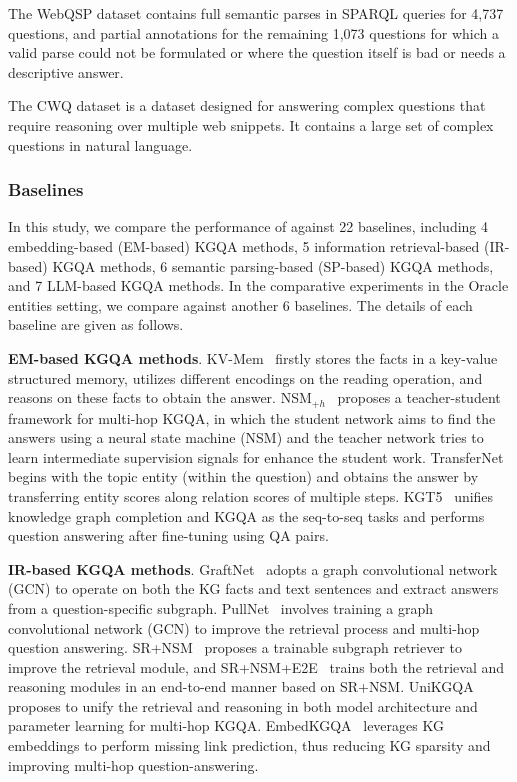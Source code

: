 The WebQSP dataset contains full semantic parses in SPARQL queries for 4,737 questions, and partial annotations for the remaining 1,073 questions for which a valid parse could not be formulated or where the question itself is bad or needs a descriptive answer.

The CWQ dataset is a dataset designed for answering complex questions that require reasoning over multiple web snippets. It contains a large set of complex questions in natural language.


\subsubsection{Baselines}

In this study, we compare the performance of \model against 22 baselines, including 4 embedding-based (EM-based) KGQA methods, 5 information retrieval-based (IR-based) KGQA methods, 6 semantic parsing-based (SP-based) KGQA methods, and 7 LLM-based KGQA methods.
In the comparative experiments in the Oracle entities setting, we compare \model against another 6 baselines.
The details of each baseline are given as follows.

\textbf{EM-based KGQA methods}.
KV-Mem~\cite{miller2016key} firstly stores the facts in a key-value structured memory, utilizes different encodings on the reading operation, and reasons on these facts to obtain the answer.
NSM$_{+h}$~\cite{NSM} proposes a teacher-student framework for multi-hop KGQA, in which the student network aims to find the answers using a neural state machine (NSM) and the teacher network tries to learn intermediate supervision signals for enhance the student work.
TransferNet~\cite{shi2021transfernet} begins with the topic entity (within the question) and obtains the answer by transferring entity scores along relation scores of multiple steps.
KGT5~\cite{KGT5} unifies knowledge graph completion and KGQA as the seq-to-seq tasks and performs question answering after fine-tuning using QA pairs.

\textbf{IR-based KGQA methods}.
GraftNet~\cite{sun-etal-2018-open} adopts a graph convolutional network (GCN) to operate on both the KG facts and text sentences and extract answers from a question-specific subgraph.
PullNet~\cite{sun-etal-2019-pullnet} involves training a graph convolutional network (GCN) to improve the retrieval process and multi-hop question answering.
SR+NSM~\cite{zhang2022subgraph} proposes a trainable subgraph retriever to improve the retrieval module, and SR+NSM+E2E~\cite{zhang2022subgraph} trains both the retrieval and reasoning modules in an end-to-end manner based on SR+NSM.
UniKGQA~\cite{unikgqa} proposes to unify the retrieval and reasoning in both model architecture and parameter learning for multi-hop KGQA.
EmbedKGQA~\cite{EmbedKGQA} leverages KG embeddings to perform missing link prediction, thus reducing KG sparsity and improving multi-hop question-answering.

